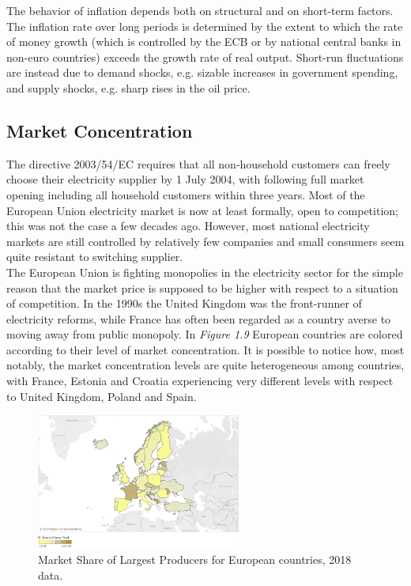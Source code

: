\documentclass{book}
\begin{document}
The behavior of inflation depends both on structural and on short-term factors. The inflation rate over long periods is determined by the extent to which the rate of money growth (which is controlled by the ECB or by national central banks in non-euro countries) exceeds the growth rate of real output. Short-run fluctuations are instead due to demand shocks, e.g. sizable increases in government spending, and supply shocks, e.g. sharp rises in the oil price. \cite{ball1993causes}

\subsection{Market Concentration}

The directive 2003/54/EC requires that all non-household customers can freely choose their electricity supplier by 1 July 2004, with following full market opening including all household customers within three years. Most of the European Union electricity market is now at least formally, open to competition; this was not the case a few decades ago. However, most national electricity markets are still controlled by relatively few companies and small consumers seem quite resistant to switching supplier. \cite{jamasb2005electricity} \\

The European Union is fighting monopolies in the electricity sector for the simple reason that the market price is supposed to be higher with respect to a situation of competition. In the 1990s the United Kingdom was the front-runner of electricity reforms, while France has often been regarded as a country averse to moving away from public monopoly. \cite{fiorio2009reform} In \textit{Figure 1.9} European countries are colored according to their level of market concentration. It is possible to notice how, most notably, the market concentration levels are quite heterogeneous among countries, with France, Estonia and Croatia experiencing very different levels with respect to United Kingdom, Poland and Spain. 

\bigskip
\begin{figure}[H]
\begin{center}
\captionsetup{justification=centering}
\includegraphics[width=0.6\textwidth]{Images/conc.png}
\caption{Market Share of Largest Producers for European countries, 2018 data. }
\end{center}
\end{figure}
\bigskip
\end{document}

